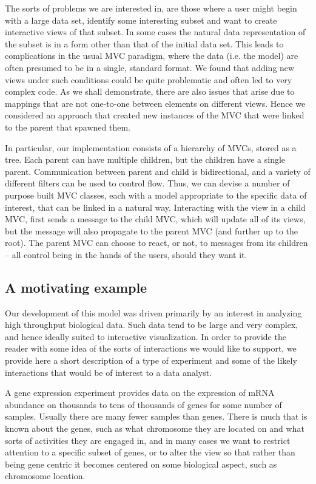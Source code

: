 \documentclass[11pt]{article}
\begin{document}
The sorts of problems we are interested in, are those where a user
might begin with a large data set, identify some interesting subset
and want to create interactive views of that subset.  In some cases the
natural data representation of the subset is in a form other than that
of the initial data set.  This leads to complications in the usual MVC
paradigm, where the data (i.e. the model) are often presumed to be in
a single, standard format.  We found that adding new views under such
conditions could be quite problematic and often led to very complex
code.  As we shall demonstrate, there are also issues that arise due to
mappings that are not one-to-one between elements on different views.
Hence we considered an approach that created new instances of
the MVC that were linked to the parent that spawned them.

In particular, our implementation consists of a hierarchy of MVCs,
stored as a tree.  Each parent can have multiple children, but the
children have a single parent.  Communication between parent and
child is bidirectional, and a variety of different filters can be used
to control flow.  Thus, we can devise a number of purpose built MVC
classes, each with a model appropriate to the specific data of
interest, that can be linked in a natural way.  Interacting with the view
in a child MVC, first sends a message to the child MVC, which will
update all of its views, but the message will also propagate to the
parent MVC (and further up to the root). The parent MVC can choose to
react, or not, to messages from its children -- all control being in
the hands of the users, should they want it.

\subsection*{A motivating example}
\label{sec:micro}

Our development of this model was driven primarily by an interest in
analyzing high throughput biological data.  Such data tend to be large
and very complex, and hence ideally suited to interactive
visualization.  In order to provide the reader with some idea of the
sorts of interactions we would like to support, we provide here a short
description of a type of experiment and some of the likely
interactions that would be of interest to a data analyst.

A gene expression experiment provides data on the expression of mRNA
abundance on thousands to tens of thousands of genes for some number
of samples. Usually there are many fewer samples than genes. There is
much that is known about the genes, such as what chromosome they are
located on and what sorts of activities they are engaged in, and in many
cases we want to restrict attention to a specific subset of genes, or
to alter the view so that rather than being gene centric it becomes
centered on some biological aspect, such as chromosome location.
\end{document}
